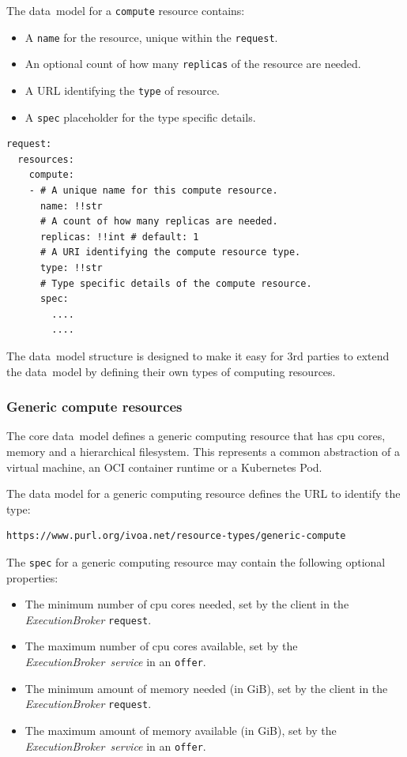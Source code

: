 \documentclass[11pt,a4paper]{ivoa}
\newcommand{\datamodel} {data~model}
\newcommand{\execbrokerclass} {\textit{ExecutionBroker}}
\newcommand{\execbrokerservice}[1] {\textit{ExecutionBroker~service#1}}
\newcommand{\kubernetes} {Kubernetes}
\newcommand{\codeword}[1] {\texttt{#1}}
\begin{document}
The \datamodel{} for a \codeword{compute} resource contains:
\begin{itemize}
    \item A \codeword{name} for the resource, unique within the \codeword{request}.
    \item An optional count of how many \codeword{replicas} of the resource are needed.
    \item A URL identifying the \codeword{type} of resource.
    \item A \codeword{spec} placeholder for the type specific details.
\end{itemize}

\begin{lstlisting}[]
request:
  resources:
    compute:
    - # A unique name for this compute resource.
      name: !!str
      # A count of how many replicas are needed.
      replicas: !!int # default: 1
      # A URI identifying the compute resource type.
      type: !!str
      # Type specific details of the compute resource.
      spec:
        ....
        ....
\end{lstlisting}

The \datamodel{} structure is designed to make it easy for 3rd parties
to extend the \datamodel{} by defining their own types of computing
resources.

\subsubsection{Generic compute resources}
\label{subsub-datamodel-generic-compute}

The core \datamodel{} defines a generic computing resource
that has cpu cores, memory and a hierarchical filesystem.
This represents a common abstraction of a virtual machine,
an OCI container runtime or a \kubernetes{} Pod.

The data model for a generic computing resource defines the URL to identify
the type:
\begin{lstlisting}[]
https://www.purl.org/ivoa.net/resource-types/generic-compute
\end{lstlisting}
\hfill \break
The \codeword{spec} for a generic computing resource may contain the following optional properties:
\begin{itemize}
    \item The minimum number of cpu cores needed, set by the client in the \execbrokerclass{} \codeword{request}.
    \item The maximum number of cpu cores available, set by the \execbrokerservice{} in an \codeword{offer}.
    \item The minimum amount of memory needed (in GiB), set by the client in the \execbrokerclass{} \codeword{request}.
    \item The maximum amount of memory available (in GiB), set by the \execbrokerservice{} in an \codeword{offer}.
\end{itemize}
\end{document}
